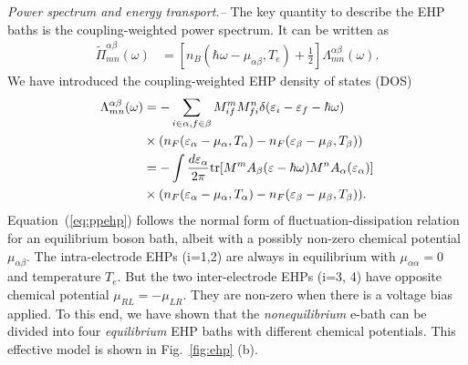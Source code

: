 \documentclass[aps
,twocolumn
,floatfix,footinbib,prl,longbibliography
]{revtex4-1}
\begin{document}
\emph{Power spectrum and energy transport.--} The key quantity to describe the EHP baths is the coupling-weighted power spectrum. It can be written as
\begin{align}
\tilde{\Pi}_{mn}^{\alpha\beta}(\omega) &= \left[n_B(\hbar\omega-\mu_{\alpha\beta},T_e)+\frac{1}{2}\right]\Lambda_{mn}^{\alpha\beta}(\omega).
\label{eq:ppehp}
\end{align}
We have introduced the coupling-weighted EHP density of states (DOS)
\begin{align}
\Lambda_{mn}^{\alpha\beta}(\omega) &= -\sum_{i\in\alpha,f\in\beta}M^{m}_{if}M^n_{fi}  \delta(\varepsilon_i-\varepsilon_f-\hbar\omega)\nonumber\\
&\times (n_F(\varepsilon_\alpha-\mu_\alpha,T_\alpha)-n_F(\varepsilon_\beta-\mu_\beta,T_\beta))\nonumber\\
&=-\int \frac{d\varepsilon_\alpha}{2\pi} {\rm tr}[M^m A_\beta(\varepsilon-\hbar\omega)M^n A_\alpha(\varepsilon_\alpha)] \nonumber\\
&\times (n_F(\varepsilon_\alpha-\mu_\alpha,T_\alpha)-n_F(\varepsilon_\beta-\mu_\beta,T_\beta)).
\label{eq:gamma}
\end{align}
Equation~(\ref{eq:ppehp}) follows the normal form of fluctuation-dissipation relation for an equilibrium boson bath, albeit with a possibly non-zero chemical potential  $\mu_{\alpha\beta}$. The intra-electrode EHPs (i=1,2) are always in equilibrium with $\mu_{\alpha\alpha}=0$ and temperature $T_e$. But the two inter-electrode EHPs (i=3, 4) have opposite chemical potential $\mu_{RL}=-\mu_{LR}$. They are non-zero when there is a voltage bias applied.  To this end, we have shown that the \emph{nonequilibrium} e-bath can be divided into four \emph{equilibrium} EHP baths with different chemical potentials.
This effective model is shown in Fig.~\ref{fig:ehp} (b).
\end{document}
